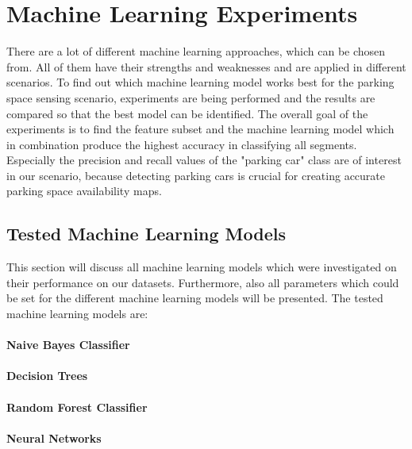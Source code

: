 \section{Machine Learning Experiments}
\label{sec:machine_learning_experiments}

There are a lot of different machine learning approaches, which can be chosen from. All of them have their strengths and weaknesses and are applied in different scenarios. To find out which machine learning model works best for the parking space sensing scenario, experiments are being performed and the results are compared so that the best model can be identified. 
The overall goal of the experiments is to find the feature subset and the machine learning model which in combination produce the highest accuracy in classifying all segments. 
Especially the precision and recall values of the "parking car" class are of interest in our scenario, because detecting parking cars is crucial for creating accurate parking space availability maps.





\subsection{Tested Machine Learning Models}
\label{sec:machine_learning_models}

This section will discuss all machine learning models which were investigated on their performance on our datasets. Furthermore, also all parameters which could be set for the different machine learning models will be presented. The tested machine learning models are:


\paragraph{Naive Bayes Classifier}
\paragraph{Decision Trees}
\paragraph{Random Forest Classifier}
\paragraph{Neural Networks}
